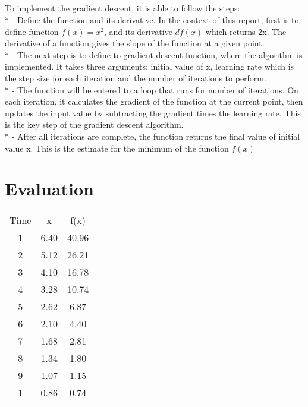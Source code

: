 \documentclass{article}
\begin{document}
\subsection{}

To implement the gradient descent, it is able to follow the steps:\\

* - Define the function and its derivative. In the context of this report, first is to define function $f(x) = x^2$, and its derivative $df(x)$ which returns 2x. The derivative of a function gives the slope of the function at a given point.\\

* - The next step is to define to gradient descent function, where the algorithm is implemented. It takes three arguments: initial value of x, learning rate which is the step size for each iteration and the number of iterations to perform.\\

* - The function will be entered to a loop that runs for number of iterations. On each iteration, it calculates the gradient of the function at the current point, then updates the input value by subtracting the gradient times the learning rate. This is the key step of the gradient descent algorithm.\\

* - After all iterations are complete, the function returns the final value of initial value x. This is the estimate for the minimum of the function $f(x)$


\section{Evaluation}

\begin{center}
\begin{tabular}{ c c c }
    Time & x & f(x) \\ 
    1 & 6.40 & 40.96 \\  
    2 & 5.12 & 26.21 \\
    3 & 4.10 & 16.78 \\
    4 & 3.28 & 10.74 \\
    5 & 2.62 & 6.87 \\    
    6 & 2.10 & 4.40  \\    
    7 & 1.68 & 2.81  \\    
    8 & 1.34 & 1.80  \\    
    9 & 1.07 & 1.15  \\    
    1 & 0.86 & 0.74  \\  
\end{tabular}
\end{center}
\end{document}
